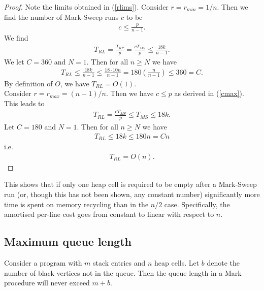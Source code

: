 \documentclass{article}
\begin{document}
\begin{proof}
	Note the limits obtained in (\ref{rlims}). Consider $r=r_{min}=1/n$. Then we find
	the number of Mark-Sweep runs $c$ to be
	\begin{align*}
		c \leq \frac{p}{n-1}.
	\end{align*}
	We find
	\begin{align*}
		T_{RL} = \frac{T_{RP}}{p} = \frac{cT_{MS}}{p} \leq \frac{18k}{n-1}.
	\end{align*}
	We let $C=360$ and $N=1$. Then for all $n\geq N$ we have
	\begin{align*}
		T_{RL} \leq \frac{18k}{n-1} \leq \frac{18\cdot 10n}{n-1} = 180\left(\frac{n}{n-1}\right) \leq 360 = C.
	\end{align*}
	By definition of $O$, we have $T_{RL}=O(1)$.\\
	Consider $r=r_{max}=(n-1)/n$. Then we have $c\leq p$ as derived in (\ref{cmax}).
	This leads to
	\begin{align*}
		T_{RL}=\frac{cT_{MS}}{p}\leq T_{MS} \leq 18k.
	\end{align*}
	Let $C=180$ and $N=1$. Then for all $n\geq N$ we have
	\begin{align*}
		T_{RL} \leq 18k \leq 180n = Cn
	\end{align*}
	i.e.
	\begin{align*}
		T_{RL} = O(n).
	\end{align*}
\end{proof}
This shows that if only one heap cell is required to be empty after a Mark-Sweep run
(or, though this has not been shown, any constant number) significantly more time is
spent on memory recycling than in the $n/2$ case. Specifically, the amortised per-line
cost goes from constant to linear with respect to $n$.

\subsection{Maximum queue length}

\begin{claim}
	\label{claimb}
	Consider a program with $m$ stack entries and $n$ heap cells.
	Let $b$ denote the number of black vertices not in the queue. Then
	the queue length in a Mark procedure will never exceed $m+b$.
\end{claim}
\end{document}
